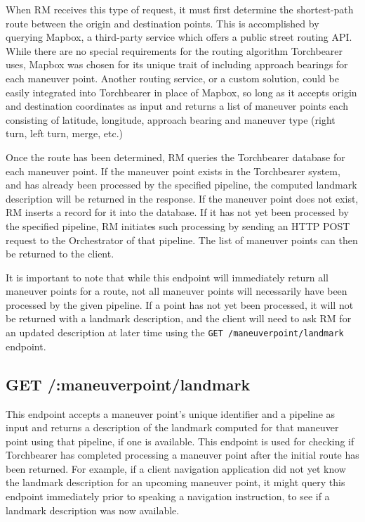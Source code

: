 When RM receives this type of request, it must first determine the shortest-path route between the origin and destination points. This is accomplished by querying Mapbox, a third-party service which offers a public street routing API. While there are no special requirements for the routing algorithm Torchbearer uses, Mapbox was chosen for its unique trait of including approach bearings for each maneuver point. Another routing service, or a custom solution, could be easily integrated into Torchbearer in place of Mapbox, so long as it accepts origin and destination coordinates as input and returns a list of maneuver points each consisting of latitude, longitude, approach bearing and maneuver type (right turn, left turn, merge, etc.)

Once the route has been determined, RM queries the Torchbearer database for each maneuver point. If the maneuver point exists in the Torchbearer system, and has already been processed by the specified pipeline, the computed landmark description will be returned in the response. If the maneuver point does not exist, RM inserts a record for it into the database. If it has not yet been processed by the specified pipeline, RM initiates such processing by sending an HTTP POST request to the Orchestrator of that pipeline. The list of maneuver points can then be returned to the client.

It is important to note that while this endpoint will immediately return all maneuver points for a route, not all maneuver points will necessarily have been processed by the given pipeline. If a point has not yet been processed, it will not be returned with a landmark description, and the client will need to ask RM for an updated description at later time using the \texttt{GET /maneuverpoint/landmark} endpoint.

\subsection{GET /:maneuverpoint/landmark}
This endpoint accepts a maneuver point’s unique identifier and a pipeline as input and returns a description of the landmark computed for that maneuver point using that pipeline, if one is available. This endpoint is used for checking if Torchbearer has completed processing a maneuver point after the initial route has been returned. For example, if a client navigation application did not yet know the landmark description for an upcoming maneuver point, it might query this endpoint immediately prior to speaking a navigation instruction, to see if a landmark description was now available.

